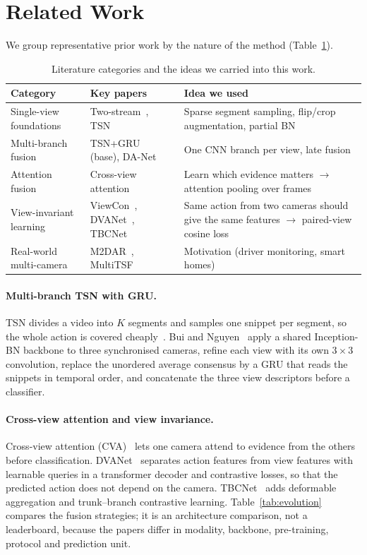 \documentclass[runningheads]{llncs}
\begin{document}
\section{Related Work}
We group representative prior work by the nature of the method (Table~\ref{tab:survey}).

\begin{table}[t]
\caption{Literature categories and the ideas we carried into this work.}\label{tab:survey}
\centering
\small
\begin{tabularx}{\textwidth}{@{}p{2.5cm}p{3.4cm}X@{}}
\toprule
Category & Key papers & Idea we used \\
\midrule
Single-view foundations & Two-stream~\cite{simonyan2014}, TSN~\cite{wang2016tsn} & Sparse segment sampling, flip/crop augmentation, partial BN \\
Multi-branch fusion & TSN+GRU~\cite{bui2020} (base), DA-Net~\cite{wang2018dana} & One CNN branch per view, late fusion \\
Attention fusion & Cross-view attention~\cite{nguyen2021} & Learn which evidence matters $\rightarrow$ attention pooling over frames \\
View-invariant learning & ViewCon~\cite{shah2023}, DVANet~\cite{siddiqui2024}, TBCNet~\cite{yang2026} & Same action from two cameras should give the same features $\rightarrow$ paired-view cosine loss \\
Real-world multi-camera & M2DAR~\cite{ma2023}, MultiTSF~\cite{nguyen2025} & Motivation (driver monitoring, smart homes) \\
\bottomrule
\end{tabularx}
\end{table}

\paragraph{Multi-branch TSN with GRU.}
TSN divides a video into $K$ segments and samples one snippet per segment, so the whole action is covered cheaply~\cite{wang2016tsn}. Bui and Nguyen~\cite{bui2020} apply a shared Inception-BN backbone to three synchronised cameras, refine each view with its own $3{\times}3$ convolution, replace the unordered average consensus by a GRU that reads the snippets in temporal order, and concatenate the three view descriptors before a classifier.

\paragraph{Cross-view attention and view invariance.}
Cross-view attention (CVA)~\cite{nguyen2021} lets one camera attend to evidence from the others before classification. DVANet~\cite{siddiqui2024} separates action features from view features with learnable queries in a transformer decoder and contrastive losses, so that the predicted action does not depend on the camera. TBCNet~\cite{yang2026} adds deformable aggregation and trunk--branch contrastive learning.
Table~\ref{tab:evolution} compares the fusion strategies; it is an architecture comparison, not a leaderboard, because the papers differ in modality, backbone, pre-training, protocol and prediction unit.
\end{document}

